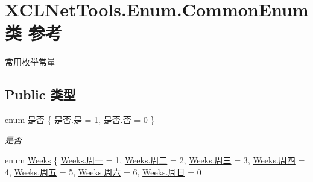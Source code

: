 \hypertarget{class_x_c_l_net_tools_1_1_enum_1_1_common_enum}{}\section{X\+C\+L\+Net\+Tools.\+Enum.\+Common\+Enum类 参考}
\label{class_x_c_l_net_tools_1_1_enum_1_1_common_enum}


常用枚举常量  


\subsection*{Public 类型}
\begin{DoxyCompactItemize}
\item 
enum \hyperlink{class_x_c_l_net_tools_1_1_enum_1_1_common_enum_a5940e298dc09411c8a238f4f4e94e633}{是否} \{ \hyperlink{class_x_c_l_net_tools_1_1_enum_1_1_common_enum_a5940e298dc09411c8a238f4f4e94e633a0a60ac8f02ccd2cf723f927284877851}{是否.\+是} = 1, 
\hyperlink{class_x_c_l_net_tools_1_1_enum_1_1_common_enum_a5940e298dc09411c8a238f4f4e94e633ac9744f45e76d885ae1c74d4f4a934b2e}{是否.\+否} = 0
 \}\begin{DoxyCompactList}\small\item\em 是否 \end{DoxyCompactList}
\item 
enum \hyperlink{class_x_c_l_net_tools_1_1_enum_1_1_common_enum_adeccaeb33560c30593da561d8d0fe8de}{Weeks} \{ \newline
\hyperlink{class_x_c_l_net_tools_1_1_enum_1_1_common_enum_adeccaeb33560c30593da561d8d0fe8dea1603b069c2acf27a87ce160aa3b01336}{Weeks.\+周一} = 1, 
\hyperlink{class_x_c_l_net_tools_1_1_enum_1_1_common_enum_adeccaeb33560c30593da561d8d0fe8deab5a6a07e48ecd1e7be525c75c7adc56b}{Weeks.\+周二} = 2, 
\hyperlink{class_x_c_l_net_tools_1_1_enum_1_1_common_enum_adeccaeb33560c30593da561d8d0fe8deae60725e762551a706d64f9c9ec55aef2}{Weeks.\+周三} = 3, 
\hyperlink{class_x_c_l_net_tools_1_1_enum_1_1_common_enum_adeccaeb33560c30593da561d8d0fe8dea170fc8e27c08f11a440bfb1cbd6cc6fd}{Weeks.\+周四} = 4, 
\newline
\hyperlink{class_x_c_l_net_tools_1_1_enum_1_1_common_enum_adeccaeb33560c30593da561d8d0fe8deaeb79cea638b82f33d30ed5600f040d4b}{Weeks.\+周五} = 5, 
\hyperlink{class_x_c_l_net_tools_1_1_enum_1_1_common_enum_adeccaeb33560c30593da561d8d0fe8dea2457513054904ecee1cf282304c39e32}{Weeks.\+周六} = 6, 
\hyperlink{class_x_c_l_net_tools_1_1_enum_1_1_common_enum_adeccaeb33560c30593da561d8d0fe8dea562d7476abdbf97e2d5bdb25cd2b9ceb}{Weeks.\+周日} = 0

\end{DoxyCompactItemize}
